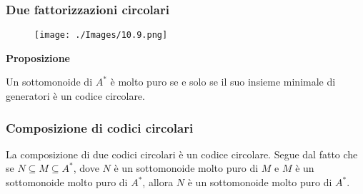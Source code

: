 \subsubsection{Due fattorizzazioni circolari}

\begin{figure}[hbpt!]
    \centering
    \texttt{[image: ./Images/10.9.png]}
\end{figure}
\FloatBarrier

\textbf{Proposizione}

Un sottomonoide di $A^{*}$ è molto puro se e solo se il suo insieme minimale di generatori è un codice circolare.

\subsubsection{Composizione di codici circolari}

La composizione di due codici circolari è un codice circolare.
Segue dal fatto che se $N \subseteq M \subseteq A^{*}$, dove $N$ è un sottomonoide molto puro di $M$ e $M$ è un sottomonoide molto puro di $A^{*}$, allora $N$ è un sottomonoide molto puro di $A^{*}$.




\let\cleardoublepage\clearpage

